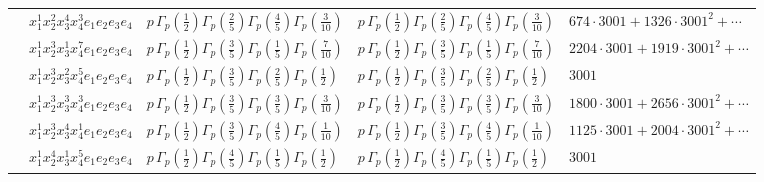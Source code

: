 \documentclass[11pt]{article}
\begin{document}
\begin{table}[ht]
{\begin{tabular}{@{}lllll@{}}
 & $x_{1}^{1} x_{2}^{2} x_{3}^{4} x_{4}^{3}  e_{1} e_{2} e_{3} e_{4}$ & $p \, \Gamma_p \left( \frac{1}{2} \right) \Gamma_p \left( \frac{2}{5} \right) \Gamma_p \left( \frac{4}{5} \right) \Gamma_p \left( \frac{3}{10} \right)$ & $p \, \Gamma_p \left( \frac{1}{2} \right) \Gamma_p \left( \frac{2}{5} \right) \Gamma_p \left( \frac{4}{5} \right) \Gamma_p \left( \frac{3}{10} \right)$ & $674{\cdot}3001{+}1326{\cdot}3001^{2}{+}\cdots$ \\
 & $x_{1}^{1} x_{2}^{3} x_{3}^{1} x_{4}^{7}  e_{1} e_{2} e_{3} e_{4}$ & $p \, \Gamma_p \left( \frac{1}{2} \right) \Gamma_p \left( \frac{3}{5} \right) \Gamma_p \left( \frac{1}{5} \right) \Gamma_p \left( \frac{7}{10} \right)$ & $p \, \Gamma_p \left( \frac{1}{2} \right) \Gamma_p \left( \frac{3}{5} \right) \Gamma_p \left( \frac{1}{5} \right) \Gamma_p \left( \frac{7}{10} \right)$ & $2204{\cdot}3001{+}1919{\cdot}3001^{2}{+}\cdots$ \\
 & $x_{1}^{1} x_{2}^{3} x_{3}^{2} x_{4}^{5}  e_{1} e_{2} e_{3} e_{4}$ & $p \, \Gamma_p \left( \frac{1}{2} \right) \Gamma_p \left( \frac{3}{5} \right) \Gamma_p \left( \frac{2}{5} \right) \Gamma_p \left( \frac{1}{2} \right)$ & $p \, \Gamma_p \left( \frac{1}{2} \right) \Gamma_p \left( \frac{3}{5} \right) \Gamma_p \left( \frac{2}{5} \right) \Gamma_p \left( \frac{1}{2} \right)$ & $3001$ \\
 & $x_{1}^{1} x_{2}^{3} x_{3}^{3} x_{4}^{3}  e_{1} e_{2} e_{3} e_{4}$ & $p \, \Gamma_p \left( \frac{1}{2} \right) \Gamma_p \left( \frac{3}{5} \right) \Gamma_p \left( \frac{3}{5} \right) \Gamma_p \left( \frac{3}{10} \right)$ & $p \, \Gamma_p \left( \frac{1}{2} \right) \Gamma_p \left( \frac{3}{5} \right) \Gamma_p \left( \frac{3}{5} \right) \Gamma_p \left( \frac{3}{10} \right)$ & $1800{\cdot}3001{+}2656{\cdot}3001^{2}{+}\cdots$ \\
 & $x_{1}^{1} x_{2}^{3} x_{3}^{4} x_{4}^{1}  e_{1} e_{2} e_{3} e_{4}$ & $p \, \Gamma_p \left( \frac{1}{2} \right) \Gamma_p \left( \frac{3}{5} \right) \Gamma_p \left( \frac{4}{5} \right) \Gamma_p \left( \frac{1}{10} \right)$ & $p \, \Gamma_p \left( \frac{1}{2} \right) \Gamma_p \left( \frac{3}{5} \right) \Gamma_p \left( \frac{4}{5} \right) \Gamma_p \left( \frac{1}{10} \right)$ & $1125{\cdot}3001{+}2004{\cdot}3001^{2}{+}\cdots$ \\
 & $x_{1}^{1} x_{2}^{4} x_{3}^{1} x_{4}^{5}  e_{1} e_{2} e_{3} e_{4}$ & $p \, \Gamma_p \left( \frac{1}{2} \right) \Gamma_p \left( \frac{4}{5} \right) \Gamma_p \left( \frac{1}{5} \right) \Gamma_p \left( \frac{1}{2} \right)$ & $p \, \Gamma_p \left( \frac{1}{2} \right) \Gamma_p \left( \frac{4}{5} \right) \Gamma_p \left( \frac{1}{5} \right) \Gamma_p \left( \frac{1}{2} \right)$ & $3001$ \\

\end{tabular}}
\end{table}
\end{document}
